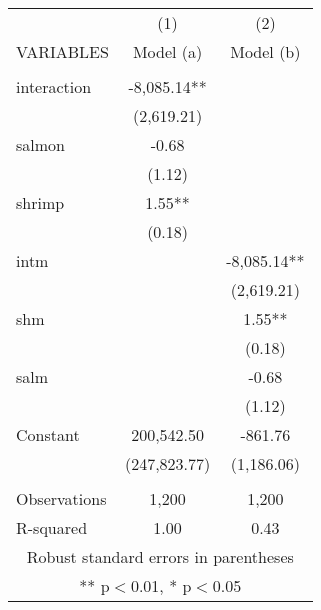 \begin{tabular}{lcc} \hline
 & (1) & (2) \\
VARIABLES & Model (a) & Model (b) \\ \hline
 &  &  \\
interaction & -8,085.14** &  \\
 & (2,619.21) &  \\
salmon & -0.68 &  \\
 & (1.12) &  \\
shrimp & 1.55** &  \\
 & (0.18) &  \\
intm &  & -8,085.14** \\
 &  & (2,619.21) \\
shm &  & 1.55** \\
 &  & (0.18) \\
salm &  & -0.68 \\
 &  & (1.12) \\
Constant & 200,542.50 & -861.76 \\
 & (247,823.77) & (1,186.06) \\
 &  &  \\
Observations & 1,200 & 1,200 \\
 R-squared & 1.00 & 0.43 \\ \hline
\multicolumn{3}{c}{ Robust standard errors in parentheses} \\
\multicolumn{3}{c}{ ** p$<$0.01, * p$<$0.05} \\
\end{tabular}
